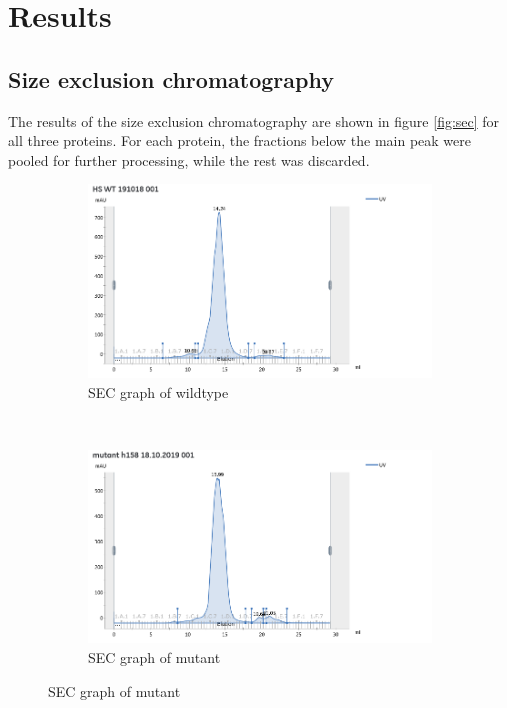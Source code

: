 \chapter{Results}

\section{Size exclusion chromatography}

The results of the size exclusion chromatography are shown in figure
\ref{fig:sec} for all three proteins. For each protein, the fractions below the
main peak were pooled for further processing, while the rest was discarded.

\begin{figure}[h]
    \centering
    \begin{subfigure}{0.45\textwidth}
        \includegraphics[width=\textwidth]{img/sec_wt}
        \caption{SEC graph of wildtype}
        \label{fig:sec_wt}
    \end{subfigure}
    ~
    \begin{subfigure}{0.45\textwidth}
        \includegraphics[width=\textwidth]{img/sec_mut}
        \caption{SEC graph of mutant}
        \label{fig:sec_mut}
    \end{subfigure}


\end{figure}
